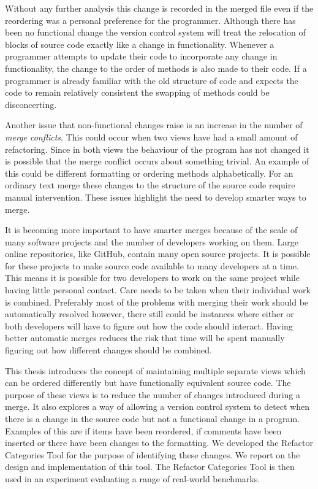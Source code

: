 Without any further analysis this change is recorded in the merged file even if the reordering was a personal preference for the programmer.  Although there has been no functional change the version control system will treat the relocation of blocks of source code exactly like a change in functionality.  Whenever a programmer attempts to update their code to incorporate any change in functionality, the change to the order of methods is also made to their code.  If a programmer is already familiar with the old structure of code and expects the code to remain relatively consistent the swapping of methods could be disconcerting.

Another issue that non-functional changes raise is an increase in the number of \emph{merge conflicts}. This could occur when two views have had a small amount of refactoring.  Since in both views the behaviour of the program has not changed it is possible that the merge conflict occurs about something trivial. An example of this could be different formatting or ordering methods alphabetically. For an ordinary text merge these changes to the structure of the source code require manual intervention. These issues highlight the need to develop smarter ways to merge.

It is becoming more important to have smarter merges because of the scale of many software projects and the number of developers working on them.
Large online repositories, like GitHub, contain many open source projects.
It is possible for these projects to make source code available to many developers at a time.
This means it is possible for two developers to work on the same project while having little personal contact.
Care needs to be taken when their individual work is combined.
Preferably most of the problems with merging their work should be automatically resolved however,
there still could be instances where either or both developers will have to figure out how the code should interact.
Having better automatic merges reduces the risk that time will be spent manually figuring out how different changes should be combined.

This thesis introduces the concept of maintaining multiple separate views which can be ordered differently but have functionally equivalent source code.
The purpose of these views is to reduce the number of changes introduced during a merge. 
It also explores a way of allowing a version control system to detect when there is a change in the source code but not a functional change in a program.
Examples of this are if items have been reordered, if comments have been inserted or there have been changes to the formatting. 
We developed the Refactor Categories Tool for the purpose of identifying these changes. 
We report on the design and implementation of this tool.
The Refactor Categories Tool is then used in an experiment evaluating a range of real-world benchmarks.


